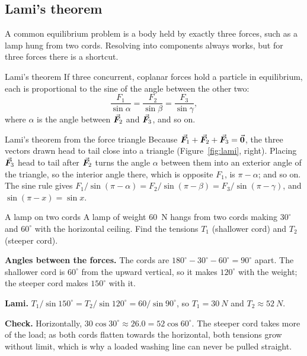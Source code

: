 \subsection{Lami's theorem}

A common equilibrium problem is a body held by exactly three forces, such as a lamp hung from two
cords. Resolving into components always works, but for three forces there is a shortcut.

\begin{keybox}{Lami's theorem}
If three concurrent, coplanar forces hold a particle in equilibrium, each is proportional to the sine of
the angle between the other two:
\[
\frac{F_1}{\sin\alpha}=\frac{F_2}{\sin\beta}=\frac{F_3}{\sin\gamma},
\]
where $\alpha$ is the angle between $\vec{\bm{F}}_2$ and $\vec{\bm{F}}_3$, and so on.
\end{keybox}

\begin{derivbox}{Lami's theorem from the force triangle}
Because $\vec{\bm{F}}_1+\vec{\bm{F}}_2+\vec{\bm{F}}_3=\vec{\bm{0}}$, the three vectors drawn head to tail close into a triangle (Figure~\ref{fig:lami}, right). Placing
$\vec{\bm{F}}_3$ head to tail after $\vec{\bm{F}}_2$ turns the angle $\alpha$ between them into an exterior angle of the
triangle, so the interior angle there, which is opposite $F_1$, is $\pi-\alpha$; and so on. The sine rule gives
$F_1/\sin(\pi-\alpha)=F_2/\sin(\pi-\beta)=F_3/\sin(\pi-\gamma)$, and $\sin(\pi-x)=\sin x$.
\end{derivbox}

\begin{figure}[htbp]
\centering
{}
\end{figure}

\begin{exbox}{A lamp on two cords}\label{ex:lami}
A lamp of weight \SI{60}{N} hangs from two cords making $30^\circ$ and $60^\circ$ with the horizontal
ceiling. Find the tensions $T_1$ (shallower cord) and $T_2$ (steeper cord).

 \textbf{Angles between the forces.} The cords are $180^\circ-30^\circ-60^\circ=90^\circ$ apart.
The shallower cord is $60^\circ$ from the upward vertical, so it makes $120^\circ$ with the weight; the
steeper cord makes $150^\circ$ with it.

 \textbf{Lami.} $T_1/\sin150^\circ=T_2/\sin120^\circ=60/\sin90^\circ$, so $T_1=\SI{30}{N}$ and
$T_2\approx\SI{52}{N}$.

 \textbf{Check.} Horizontally, $30\cos30^\circ\approx26.0=52\cos60^\circ$. The steeper cord takes
more of the load; as both cords flatten towards the horizontal, both tensions grow without limit, which
is why a loaded washing line can never be pulled straight. 
\end{exbox}

